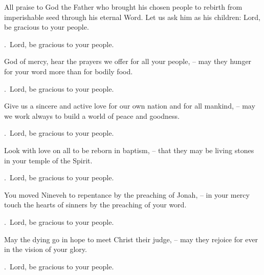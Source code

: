 \lettrine[loversize=0.15,lines=2]{A}{}ll praise to God the Father who brought his chosen people to rebirth from imperishable seed through his eternal Word. Let us ask him as his children: Lord, be gracious to your people.
\par \Rbar.~Lord, be gracious to your people.

God of mercy, hear the prayers we offer for all your people,
– may they hunger for your word more than for bodily food.
\par \Rbar.~Lord, be gracious to your people.

Give us a sincere and active love for our own nation and for all mankind,
– may we work always to build a world of peace and goodness.
\par \Rbar.~Lord, be gracious to your people.

Look with love on all to be reborn in baptism,
– that they may be living stones in your temple of the Spirit.
\par \Rbar.~Lord, be gracious to your people.

You moved Nineveh to repentance by the preaching of Jonah,
– in your mercy touch the hearts of sinners by the preaching of your word.
\par \Rbar.~Lord, be gracious to your people.

May the dying go in hope to meet Christ their judge,
– may they rejoice for ever in the vision of your glory.
\par \Rbar.~Lord, be gracious to your people.
